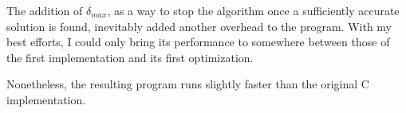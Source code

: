 \documentclass[12pt]{article}
\begin{document}
The addition of $\delta_{max}$, as a way to stop the algorithm once a sufficiently accurate solution is found, inevitably added another overhead to the program.
With my best efforts, I could only bring its performance to somewhere between those of the first implementation and its first optimization.

Nonetheless, the resulting program runs slightly faster than the original C implementation.


% 
\end{document}
